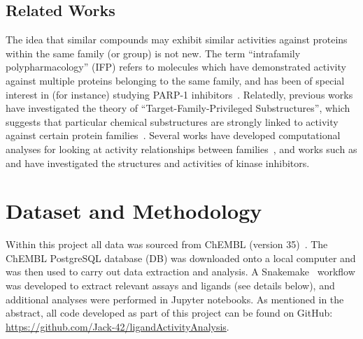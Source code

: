 \documentclass[11pt]{article}
\begin{document}
\subsection*{Related Works}
The idea that similar compounds may exhibit similar activities against proteins within the same family (or group) is not new. 
The term ``intrafamily polypharmacology'' (IFP) refers to molecules which have demonstrated activity against multiple proteins belonging to the same family, and has been of special interest in (for instance) studying PARP-1 inhibitors~\cite{passeri_camaioni_liscio_sabbatini_ferri_carotti_giacchè_pellicciari_gioiello_macchiarulo_2015, antolin_ameratunga_banerji_clarke_workman_al-lazikani_2020}. 
Relatedly, previous works have investigated the theory of ``Target-Family-Privileged Substructures'', which suggests that particular chemical substructures are strongly linked to activity against certain protein families~\cite{schnur_hermsmeier_tebben_2006}. 
Several works have developed computational analyses for looking at activity relationships between families~\cite{bajorath_2008}, and works such as \cite{filip_miljkovic_jurgen_bajorath_2018} and \cite{lo_liu_morrissey_kakiuchi-kiyota_johnson_broccatelli_zhong_joshi_altman_2018} have investigated the structures and activities of kinase inhibitors. 


\section*{Dataset and Methodology}\label{sec:methodology}
Within this project all data was sourced from ChEMBL (version 35)~\cite{chembl_db_2023}. 
The ChEMBL PostgreSQL database (DB) was downloaded onto a local computer and was then used to carry out data extraction and analysis. 
A Snakemake~\cite{snakemake_2021} workflow was developed to extract relevant assays and ligands (see details below), and additional analyses were performed in Jupyter notebooks. 
As mentioned in the abstract, all code developed as part of this project can be found on GitHub: \href{https://github.com/Jack-42/ligandActivityAnalysis}{https://github.com/Jack-42/ligandActivityAnalysis}. 
\end{document}
